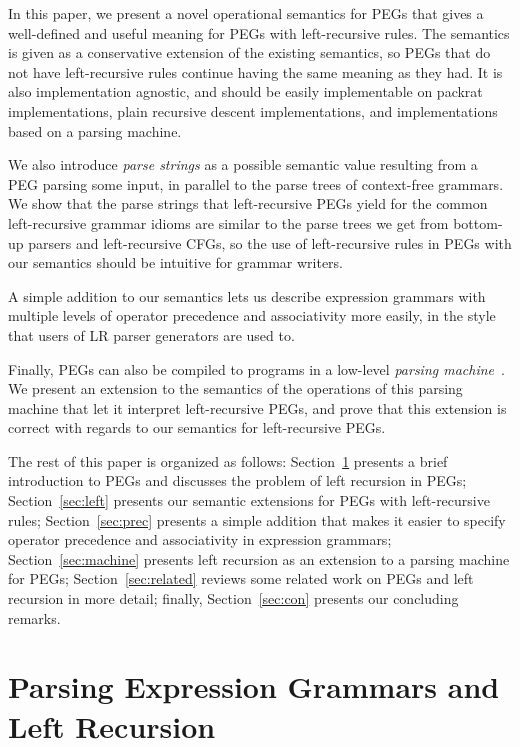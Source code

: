In this paper, we present a novel operational semantics for PEGs that
gives a well-defined and useful meaning for PEGs with left-recursive
rules. The semantics is given as a conservative extension of the
existing semantics, so PEGs that do not have left-recursive rules
continue having the same meaning as they had. It is also implementation agnostic, and
should be easily implementable on packrat implementations, plain
recursive descent implementations, and implementations based on a
parsing machine.

We also introduce {\em parse strings} as a possible semantic value
resulting from a PEG parsing some input, in parallel to the parse
trees of context-free grammars. We show that the parse strings that
left-recursive PEGs yield for the common left-recursive grammar
idioms are similar to the parse trees we get from bottom-up parsers
and left-recursive CFGs, so the use of left-recursive rules in PEGs
with our semantics should be intuitive for grammar writers.

A simple addition to our semantics lets us describe expression
grammars with multiple levels of operator precedence and associativity
more easily, in the style that users of LR parser generators are used
to.

Finally, PEGs can also be compiled to programs in a low-level {\em parsing
  machine}~\cite{dls:lpeg}. We present an extension to the semantics of the operations
of this parsing machine that let it interpret left-recursive PEGs, and
prove that this extension is correct with regards to our semantics for
left-recursive PEGs.

The rest of this paper is organized as follows: Section~\ref{sec:peg}
presents a brief introduction to PEGs and discusses the problem
of left recursion in PEGs; Section~\ref{sec:left} presents our
semantic extensions for PEGs with left-recursive
rules; Section~\ref{sec:prec} presents a simple addition that makes it
easier to specify operator precedence and associativity in expression
grammars; Section~\ref{sec:machine} presents left recursion as an
extension to a parsing machine for PEGs; Section~\ref{sec:related} reviews
some related work on PEGs and left recursion in more detail; finally,
Section~\ref{sec:con} presents our concluding remarks.

\section{Parsing Expression Grammars and Left Recursion}
\label{sec:peg}

